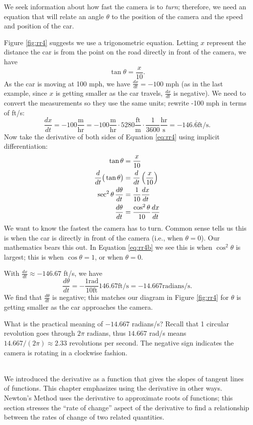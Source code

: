 {We seek information about how fast the camera is to \textit{turn}; therefore, we need an equation that will relate an angle $\theta$ to the position of the camera and the speed and position of the car.

Figure \ref{fig:rr4} suggests we use a trigonometric equation. Letting $x$ represent the distance the car is from the point on the road directly in front of the camera, we have \begin{equation}\tan \theta = \frac{x}{10}.\label{eq:rr4}\end{equation} As the car is moving at 100 mph, we have $\frac{dx}{dt} = -100$ mph (as in the last example, since $x$ is getting smaller as the car travels, $\frac{dx}{dt}$ is negative). We need to convert the measurements so they use the same units; rewrite -100 mph in terms of ft/s:
$$\frac{dx}{dt} = -100\frac{\text{m}}{\text{hr}} = -100\frac{\text{m}}{\text{hr}}\cdot5280\frac{\text{ft}}{\text{m}}\cdot\frac{1}{3600}\frac{\text{hr}}{\text{s}} =-146.\overline{6}\text{ft/s}.$$
Now take the derivative of both sides of Equation \eqref{eq:rr4} using implicit differentiation:
\begin{align}
		\tan \theta &= \frac{x}{10} \notag \\
		\frac{d}{dt}\big(\tan \theta\big) &= \frac{d}{dt}\left(\frac{x}{10}\right)\notag \\
		\sec^2\theta\,\frac{d\theta}{dt} &= \frac{1}{10}\frac{dx}{dt}\notag\\
		\frac{d\theta}{dt} &= \frac{\cos^2\theta}{10}\frac{dx}{dt}\label{eq:rr4b}
\end{align}
We want to know the fastest the camera has to turn. Common sense tells us this is when the car is directly in front of the camera (i.e., when $\theta = 0$). Our mathematics bears this out. In Equation \eqref{eq:rr4b} we see this is when $\cos^2\theta$ is largest; this is when $\cos \theta = 1$, or when $\theta = 0$.

With $\frac{dx}{dt} \approx -146.67$ ft/s, we have 
	$$\frac{d\theta}{dt} = -\frac{1\text{rad}}{10\text{ft}}146.67 \text{ft/s} = -14.667 \text{radians/s}.$$
We find that $\frac{d\theta}{dt}$ is negative; this matches our diagram in Figure \ref{fig:rr4} for $\theta$ is getting smaller as the car approaches the camera.	
	
What is the practical meaning of $-14.667$ radians/s? Recall that 1 circular revolution goes through $2\pi$ radians, thus $14.667$ rad/s means $14.667/(2\pi)\approx 2.33$ revolutions per second. The negative sign indicates the camera is rotating in a clockwise fashion.
}\\

We introduced the derivative as a function that gives the slopes of tangent lines of functions. This chapter emphasizes using the derivative in other ways. Newton's Method uses the derivative to approximate roots of functions; this section stresses the ``rate of change'' aspect of the derivative to find a relationship between the rates of change of two related quantities. 


